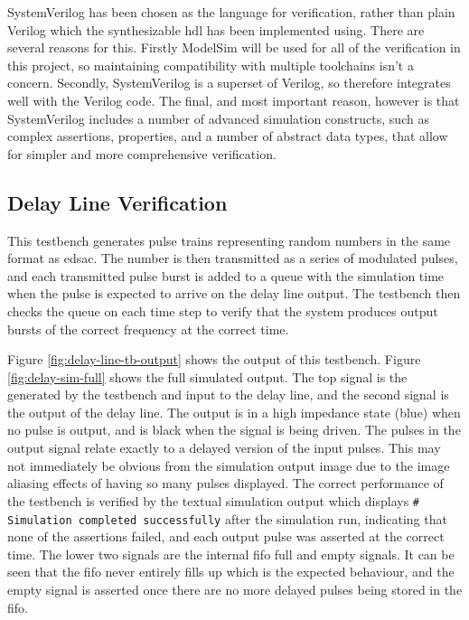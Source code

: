 SystemVerilog has been chosen as the language for verification, rather than plain Verilog which the synthesizable \gls{hdl} has been implemented using. There are several reasons for this. Firstly ModelSim will be used for all of the verification in this project, so maintaining compatibility with multiple toolchains isn't a concern. Secondly, SystemVerilog is a superset of Verilog, so therefore integrates well with the Verilog code. The final, and most important reason, however is that SystemVerilog includes a number of advanced simulation constructs, such as complex assertions, properties, and a number of abstract data types, that allow for simpler and more comprehensive verification.

\subsection{Delay Line Verification}
 This testbench generates pulse trains representing random numbers in the same format as \gls{edsac}. The number is then transmitted as a series of modulated pulses, and each transmitted pulse burst is added to a queue with the simulation time when the pulse is expected to arrive on the delay line output. The testbench then checks the queue on each time step to verify that the system produces output bursts of the correct frequency at the correct time.
 
 Figure \ref{fig:delay-line-tb-output} shows the output of this testbench. Figure \ref{fig:delay-sim-full} shows the full simulated output. The top signal is the generated by the testbench and input to the delay line, and the second signal is the output of the delay line. The output is in a high impedance state (blue) when no pulse is output, and is black when the signal is being driven. The pulses in the output signal relate exactly to a delayed version of the input pulses. This may not immediately be obvious from the simulation output image due to the image aliasing effects of having so many pulses displayed. The correct performance of the testbench is verified by the textual simulation output which displays \texttt{\# Simulation completed successfully} after the simulation run, indicating that none of the assertions failed, and each output pulse was asserted at the correct time. The lower two signals are the internal \gls{fifo} full and empty signals. It can be seen that the \gls{fifo} never entirely fills up which is the expected behaviour, and the empty signal is asserted once there are no more delayed pulses being stored in the \gls{fifo}.
 
